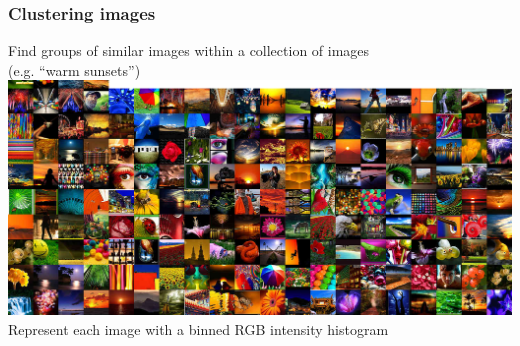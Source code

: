 \begin{frame}
  \frametitle{Clustering images}

  \begin{center}
    Find groups of similar images within a collection of images \\
    (e.g. ``warm sunsets'')
    \vskip20pt
    \includegraphics[height=0.25\textheight]{../../code/image_data/flickr_vivid_cluster_0.png}
    \vskip20pt
    Represent each image with a binned RGB intensity histogram
  \end{center}

\end{frame}


